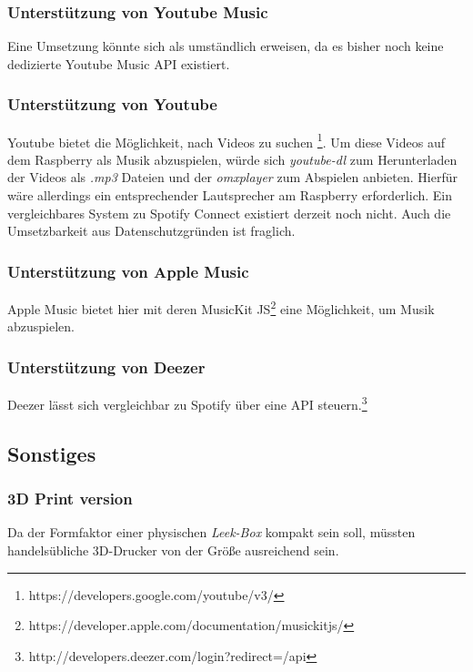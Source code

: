 \documentclass[10pt, a4paper]{article}
\begin{document}
\begin{onehalfspace}
\subsubsection*{Unterstützung von Youtube Music}
Eine Umsetzung könnte sich als umständlich erweisen, da es bisher noch keine dedizierte Youtube Music API existiert.

\subsubsection*{Unterstützung von Youtube}
Youtube bietet die Möglichkeit, nach Videos zu suchen \footnote{https://developers.google.com/youtube/v3/}. Um diese Videos auf dem Raspberry als Musik abzuspielen, würde sich \textit{youtube-dl} zum Herunterladen der Videos als \textit{.mp3} Dateien und der \textit{omxplayer} zum Abspielen anbieten.
Hierfür wäre allerdings ein entsprechender Lautsprecher am Raspberry erforderlich.
Ein vergleichbares System zu Spotify Connect existiert derzeit noch nicht.
Auch die Umsetzbarkeit aus Datenschutzgründen ist fraglich.

\subsubsection*{Unterstützung von Apple Music}
Apple Music bietet hier mit deren MusicKit JS\footnote{https://developer.apple.com/documentation/musickitjs/} eine Möglichkeit, um Musik abzuspielen.

\subsubsection*{Unterstützung von Deezer}
Deezer lässt sich vergleichbar zu Spotify über eine API steuern.\footnote{http://developers.deezer.com/login?redirect=/api}

\subsection{Sonstiges}
\subsubsection*{3D Print version}
Da der Formfaktor einer physischen \textit{Leek-Box} kompakt sein soll, müssten handelsübliche 3D-Drucker von der Größe ausreichend sein.


\end{onehalfspace}
\end{document}
